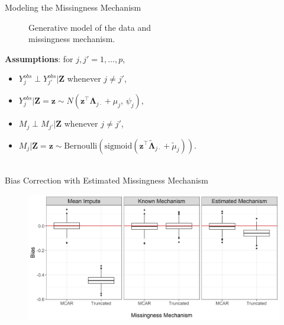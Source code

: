 \documentclass[aspectratio=169,xcolor=dvipsnames]{beamer}
\begin{document}
\begin{frame}{Modeling the Missingness Mechanism}
    \noindent\begin{minipage}[t]{0.48\linewidth}
    \begin{figure}
        \caption{Generative model of the data and \\missingness mechanism.}
    \end{figure}
    \end{minipage}
    \fontsize{10pt}{10}\selectfont
    \noindent\begin{minipage}[t]{0.48\linewidth}
\vspace{1cm}
\noindent \textbf{Assumptions}: for $j, j'=1, \dots, p$, 
\vspace{.5cm}
    \begin{itemize}
        \item $Y_j^{obs} \perp Y_{j'}^{obs}|\boldsymbol Z$ whenever $j\neq j'$,
        \item $Y_j^{obs}|\boldsymbol Z = \boldsymbol z \sim N(\boldsymbol z^\top \boldsymbol \Lambda_{j\cdot} + \mu_j,\, \psi_j)$,
        \vspace{.3cm}
        \item $M_{j} \perp M_{j'}|\boldsymbol Z$ whenever $j\neq j'$,
        \item $M_{j}|\boldsymbol Z = \boldsymbol z \sim \text{Bernoulli}(\text{sigmoid}(\boldsymbol z^\top \widetilde{\boldsymbol \Lambda}_{j\cdot} + \widetilde{\mu}_j))$.
    \end{itemize}   
    \begin{align*}
    \end{align*}
    \end{minipage}
\end{frame}

\begin{frame}{Bias Correction with Estimated Missingness Mechanism}
    \begin{figure}
        \centering
        \includegraphics[width=.95\textwidth]{images/plot_bias_3.jpg}
    \end{figure}
\end{frame}
\end{document}
